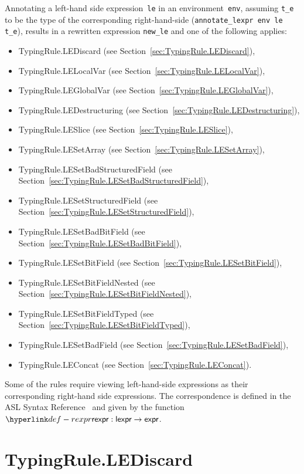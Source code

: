 \documentclass{book}
\begin{document}
\begin{itemize}
Annotating a left-hand side expression~\texttt{le} in an environment~\texttt{env}, assuming \texttt{t\_e}
to be the type of the corresponding right-hand-side (\texttt{annotate\_lexpr env le t\_e}),
results in a rewritten expression \texttt{new\_le} and one of the following applies:
\begin{itemize}
\item TypingRule.LEDiscard (see Section~\ref{sec:TypingRule.LEDiscard}),
\item TypingRule.LELocalVar (see Section~\ref{sec:TypingRule.LELocalVar}),
\item TypingRule.LEGlobalVar (see Section~\ref{sec:TypingRule.LEGlobalVar}),
\item TypingRule.LEDestructuring (see Section~\ref{sec:TypingRule.LEDestructuring}),
\item TypingRule.LESlice (see Section~\ref{sec:TypingRule.LESlice}),
\item TypingRule.LESetArray (see Section~\ref{sec:TypingRule.LESetArray}),
\item TypingRule.LESetBadStructuredField (see Section~\ref{sec:TypingRule.LESetBadStructuredField}),
\item TypingRule.LESetStructuredField (see Section~\ref{sec:TypingRule.LESetStructuredField}),
\item TypingRule.LESetBadBitField (see Section~\ref{sec:TypingRule.LESetBadBitField}),
\item TypingRule.LESetBitField (see Section~\ref{sec:TypingRule.LESetBitField}),
\item TypingRule.LESetBitFieldNested (see Section~\ref{sec:TypingRule.LESetBitFieldNested}),
\item TypingRule.LESetBitFieldTyped (see Section~\ref{sec:TypingRule.LESetBitFieldTyped}),
\item TypingRule.LESetBadField (see Section~\ref{sec:TypingRule.LESetBadField}),
\item TypingRule.LEConcat (see Section~\ref{sec:TypingRule.LEConcat}).
\end{itemize}

Some of the rules require viewing left-hand-side expressions as their corresponding right-hand side expressions.
The correspondence is defined in the ASL Syntax Reference~\cite[Chapter 5]{ASLAbstractSyntaxReference}
and given by the function $\torexpr : \lexpr \rightarrow \expr$.

\section{TypingRule.LEDiscard \label{sec:TypingRule.LEDiscard}}


\end{itemize}
\end{document}
